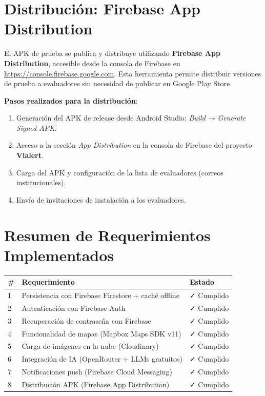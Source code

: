 \documentclass[12pt,a4paper]{article}
\begin{document}
\section{Distribución: Firebase App Distribution}

El APK de prueba se publica y distribuye utilizando \textbf{Firebase App Distribution}, accesible desde la consola de Firebase en \url{https://console.firebase.google.com}. Esta herramienta permite distribuir versiones de prueba a evaluadores sin necesidad de publicar en Google Play Store.

\textbf{Pasos realizados para la distribución}:
\begin{enumerate}[leftmargin=1.5em]
    \item Generación del APK de release desde Android Studio: \textit{Build → Generate Signed APK}.
    \item Acceso a la sección \textit{App Distribution} en la consola de Firebase del proyecto \textbf{Vialert}.
    \item Carga del APK y configuración de la lista de evaluadores (correos institucionales).
    \item Envío de invitaciones de instalación a los evaluadores.
\end{enumerate}

\section{Resumen de Requerimientos Implementados}

\begin{center}
\begin{tabularx}{\textwidth}{lXl}
\toprule
\textbf{\#} & \textbf{Requerimiento} & \textbf{Estado} \\
\midrule
1 & Persistencia con Firebase Firestore + caché offline & \textcolor{green!60!black}{✓ Cumplido} \\
2 & Autenticación con Firebase Auth & \textcolor{green!60!black}{✓ Cumplido} \\
3 & Recuperación de contraseña con Firebase & \textcolor{green!60!black}{✓ Cumplido} \\
4 & Funcionalidad de mapas (Mapbox Maps SDK v11) & \textcolor{green!60!black}{✓ Cumplido} \\
5 & Carga de imágenes en la nube (Cloudinary) & \textcolor{green!60!black}{✓ Cumplido} \\
6 & Integración de IA (OpenRouter + LLMs gratuitos) & \textcolor{green!60!black}{✓ Cumplido} \\
7 & Notificaciones push (Firebase Cloud Messaging) & \textcolor{green!60!black}{✓ Cumplido} \\
8 & Distribución APK (Firebase App Distribution) & \textcolor{green!60!black}{✓ Cumplido} \\
\bottomrule
\end{tabularx}
\end{center}
\end{document}
